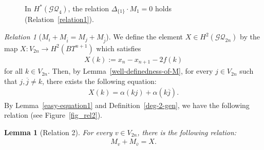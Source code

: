 \documentclass[12pt]{amsart}
\newtheorem{lemma}[theorem]{Lemma}
\theoremstyle{remark}
\newtheorem{relation}{Relation}
\numberwithin{equation}{section}
\begin{document}
\begin{figure}[H]
\caption{In $H^{*}(\mathcal{GQ}_{4})$, the relation $\Delta_{\{1\}}\cdot M_{1}=0$ holds  (Relation~\ref{relation1}).}
\label{fig_rel1}
\end{figure}

\begin{relation}[$M_{i}+M_{\overline{i}}=M_{j}+M_{\overline{j}}$]
\label{relation2}
We define the element $X\in H^{2}(\mathcal{GQ}_{2n})$ by the map $X:V_{2n}\to H^{2}(BT^{n+1})$ which satisfies  
\begin{align*}
X(k):=x_{n}-x_{n+1}-2f(k)
\end{align*}
for all $k\in V_{2n}$.
Then, by Lemma~\ref{well-definedness-of-M}, 
for every $j\in V_{2n}$ such that $j, \overline{j}\not=k$, there exists the following equation: 
\begin{align*}
X(k)=
\alpha(kj)+\alpha(k\overline{j}).
\end{align*}
By Lemma~\ref{easy-equation1} and 
Definition~\ref{deg-2-gen}, we have the following relation (see Figure~\ref{fig_rel2}).
\begin{lemma}[Relation 2]
\label{lem-for-rel2}
For every $v\in V_{2n}$, 
there is the following relation:
\begin{align}
\label{2nd-rel}
M_{v}+M_{\overline{v}}=X.
\end{align}
\end{lemma}
\end{relation}
\end{document}
